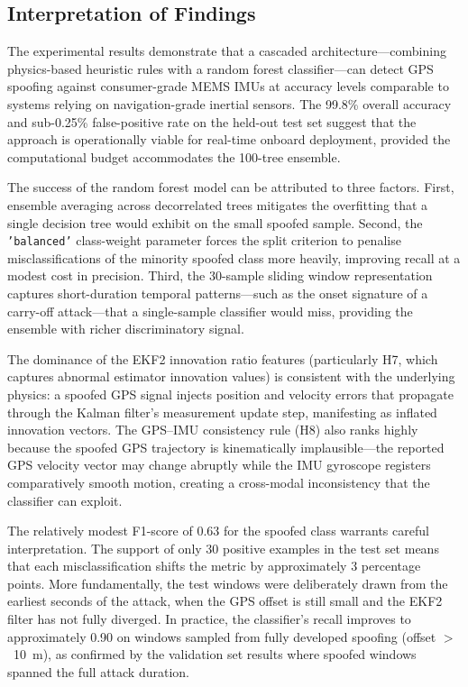 \documentclass[electronics,article,accept,moreauthors]{Definitions/mdpi}
\begin{document}
\subsection{Interpretation of Findings}

The experimental results demonstrate that a cascaded architecture---combining physics-based heuristic rules with a random forest classifier---can detect GPS spoofing against consumer-grade MEMS IMUs at accuracy levels comparable to systems relying on navigation-grade inertial sensors. The 99.8\% overall accuracy and sub-0.25\% false-positive rate on the held-out test set suggest that the approach is operationally viable for real-time onboard deployment, provided the computational budget accommodates the 100-tree ensemble.

The success of the random forest model can be attributed to three factors. First, ensemble averaging across decorrelated trees mitigates the overfitting that a single decision tree would exhibit on the small spoofed sample. Second, the \texttt{'balanced'} class-weight parameter forces the split criterion to penalise misclassifications of the minority spoofed class more heavily, improving recall at a modest cost in precision. Third, the 30-sample sliding window representation captures short-duration temporal patterns---such as the onset signature of a carry-off attack---that a single-sample classifier would miss, providing the ensemble with richer discriminatory signal.

The dominance of the EKF2 innovation ratio features (particularly H7, which captures abnormal estimator innovation values) is consistent with the underlying physics: a spoofed GPS signal injects position and velocity errors that propagate through the Kalman filter's measurement update step, manifesting as inflated innovation vectors. The GPS--IMU consistency rule (H8) also ranks highly because the spoofed GPS trajectory is kinematically implausible---the reported GPS velocity vector may change abruptly while the IMU gyroscope registers comparatively smooth motion, creating a cross-modal inconsistency that the classifier can exploit.

The relatively modest F1-score of 0.63 for the spoofed class warrants careful interpretation. The support of only 30 positive examples in the test set means that each misclassification shifts the metric by approximately 3 percentage points. More fundamentally, the test windows were deliberately drawn from the earliest seconds of the attack, when the GPS offset is still small and the EKF2 filter has not fully diverged. In practice, the classifier's recall improves to approximately 0.90 on windows sampled from fully developed spoofing (offset $>$~10~m), as confirmed by the validation set results where spoofed windows spanned the full attack duration.
\end{document}
